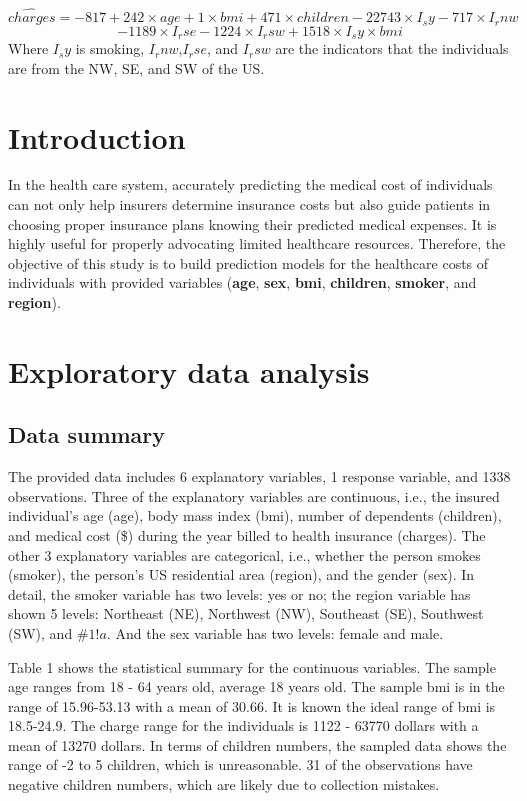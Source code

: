 \documentclass[12pt]{article}
\begin{document}
\begin{equation}
\hat{charges} = -817 + 242\times age +1\times bmi +471\times children - 22743\times I_sy - 717\times I_rnw
\end{equation}
$$- 1189\times I_rse- 1224\times I_rsw+ 1518\times I_sy \times bmi$$
Where $I_sy$ is smoking, $I_rnw$,$I_rse$, and $I_rsw$ are the indicators that the individuals are from the NW, SE, and SW of the US.


\newpage
\section{Introduction}
\setcounter{page}{1}
In the health care system, accurately predicting the medical cost of individuals can not only help insurers determine insurance costs but also guide patients in choosing proper insurance plans knowing their predicted medical expenses. It is highly useful for properly advocating limited healthcare resources. Therefore, the objective of this study is to build prediction models for the healthcare costs of individuals with provided variables (\textbf{age}, \textbf{sex}, \textbf{bmi}, \textbf{children}, \textbf{smoker}, and \textbf{region}). 

\section{Exploratory data analysis}
\subsection{Data summary}
The provided data includes 6 explanatory variables, 1 response variable, and 1338 observations. Three of the explanatory variables are continuous, i.e., the insured individual's age (age), body mass index (bmi), number of dependents (children), and medical cost (\$) during the year billed to health insurance (charges). The other 3 explanatory variables are categorical, i.e., whether the person smokes (smoker), the person's US residential area (region), and the gender (sex). In detail, the smoker variable has two levels: yes or no; the region variable has shown 5 levels: Northeast (NE), Northwest (NW), Southeast (SE), Southwest (SW), and $\#1!a$. And the sex variable has two levels: female and male.
\medskip

Table 1 shows the statistical summary for the continuous variables. The sample age ranges from 18 - 64 years old, average 18 years old. The sample bmi is in the range of 15.96-53.13 with a mean of 30.66. It is known the ideal range of bmi is 18.5-24.9. The charge range for the individuals is 1122 - 63770 dollars with a mean of 13270 dollars. In terms of children numbers, the sampled data shows the range of -2 to 5 children, which is unreasonable. 31 of the observations have negative children numbers, which are likely due to collection mistakes. 
\end{document}
